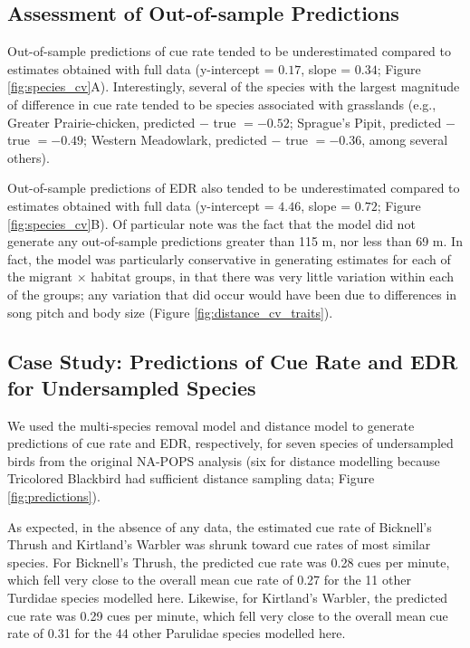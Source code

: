 \documentclass[12pt]{article}
\begin{document}
\subsection{Assessment of Out-of-sample Predictions}

\par Out-of-sample predictions of cue rate tended to be underestimated compared to estimates obtained with full data (y-intercept = $0.17$, slope = $0.34$; Figure \ref{fig:species_cv}A).
Interestingly, several of the species with the largest magnitude of difference in cue rate tended to be species associated with grasslands (e.g., Greater Prairie-chicken, predicted $-$ true $= -0.52$; Sprague's Pipit, predicted $-$ true $= -0.49$; Western Meadowlark, predicted $-$ true $= -0.36$, among several others).

\par Out-of-sample predictions of EDR also tended to be underestimated compared to estimates obtained with full data (y-intercept = $4.46$, slope = $0.72$; Figure \ref{fig:species_cv}B).
Of particular note was the fact that the model did not generate any out-of-sample predictions greater than 115 m, nor less than 69 m.
In fact, the model was particularly conservative in generating estimates for each of the migrant $\times$ habitat groups, in that there was very little variation within each of the groups; any variation that did occur would have been due to differences in song pitch and body size (Figure \ref{fig:distance_cv_traits}).

\subsection{Case Study: Predictions of Cue Rate and EDR for Undersampled Species}

\par We used the multi-species removal model and distance model to generate predictions of cue rate and EDR, respectively, for seven species of undersampled birds from the original NA-POPS analysis (six for distance modelling because Tricolored Blackbird had sufficient distance sampling data; Figure \ref{fig:predictions}).

\par As expected, in the absence of any data, the estimated cue rate of Bicknell’s Thrush and Kirtland’s Warbler was shrunk toward cue rates of most similar species.
For Bicknell's Thrush, the predicted cue rate was 0.28 cues per minute, which fell very close to the overall mean cue rate of 0.27 for the 11 other Turdidae species modelled here.
Likewise, for Kirtland's Warbler, the predicted cue rate was 0.29 cues per minute, which fell very close to the overall mean cue rate of 0.31 for the 44 other Parulidae species modelled here.
\end{document}
